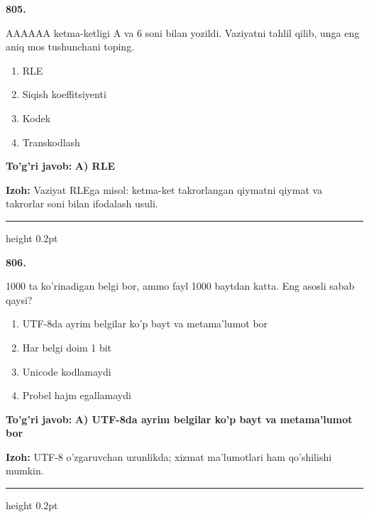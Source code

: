 \documentclass[10pt,a4paper,oneside]{article}
\begin{document}
\noindent\textbf{\color{ink}805.}
\par
AAAAAA ketma-ketligi A va 6 soni bilan yozildi. Vaziyatni tahlil qilib, unga eng aniq mos tushunchani toping.
\begin{enumerate}[label=\Alph*),leftmargin=9mm]
\item RLE
\item Siqish koeffitsiyenti
\item Kodek
\item Transkodlash
\end{enumerate}
\begin{tcolorbox}[enhanced,breakable,colback=teal!4,colframe=teal!50!black,boxrule=0.5pt,arc=1.1mm,left=3mm,right=3mm,top=1.7mm,bottom=1.7mm,before skip=2mm,after skip=2mm]
\textbf{\color{teal}To'g'ri javob:} \textbf{A) RLE}
\par\smallskip
\textbf{Izoh:} Vaziyat RLEga misol: ketma-ket takrorlangan qiymatni qiymat va takrorlar soni bilan ifodalash usuli.
\end{tcolorbox}
\vspace{2mm}\hrule height 0.2pt \vspace{3mm}

\noindent\textbf{\color{ink}806.}
\par
1000 ta ko'rinadigan belgi bor, ammo fayl 1000 baytdan katta. Eng asosli sabab qaysi?
\begin{enumerate}[label=\Alph*),leftmargin=9mm]
\item UTF-8da ayrim belgilar ko'p bayt va metama'lumot bor
\item Har belgi doim 1 bit
\item Unicode kodlamaydi
\item Probel hajm egallamaydi
\end{enumerate}
\begin{tcolorbox}[enhanced,breakable,colback=teal!4,colframe=teal!50!black,boxrule=0.5pt,arc=1.1mm,left=3mm,right=3mm,top=1.7mm,bottom=1.7mm,before skip=2mm,after skip=2mm]
\textbf{\color{teal}To'g'ri javob:} \textbf{A) UTF-8da ayrim belgilar ko'p bayt va metama'lumot bor}
\par\smallskip
\textbf{Izoh:} UTF-8 o'zgaruvchan uzunlikda; xizmat ma'lumotlari ham qo'shilishi mumkin.
\end{tcolorbox}
\vspace{2mm}\hrule height 0.2pt \vspace{3mm}
\end{document}
